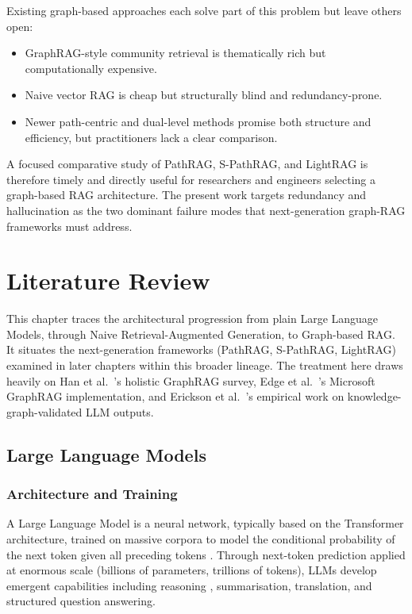 \documentclass[12pt,a4paper,oneside]{report}
\begin{document}
Existing graph-based approaches each solve part of this problem but leave
others open:
\begin{itemize}[leftmargin=2em,itemsep=2pt]
    \item GraphRAG-style community retrieval is thematically rich but
          computationally expensive.
    \item Naive vector RAG is cheap but structurally blind and
          redundancy-prone.
    \item Newer path-centric and dual-level methods promise both structure
          and efficiency, but practitioners lack a clear comparison.
\end{itemize}

A focused comparative study of PathRAG, S-PathRAG, and LightRAG is therefore
timely and directly useful for researchers and engineers selecting a
graph-based RAG architecture. The present work targets redundancy and
hallucination \citep{tonmoy2024} as the two dominant failure modes that
next-generation graph-RAG frameworks must address.

\chapter{Literature Review}
\label{ch:literature_review}

This chapter traces the architectural progression from plain Large Language
Models, through Naive Retrieval-Augmented Generation, to Graph-based RAG. It
situates the next-generation frameworks (PathRAG, S-PathRAG, LightRAG)
examined in later chapters within this broader lineage. The treatment here
draws heavily on Han et al.~\citep{han2025}'s holistic GraphRAG survey,
Edge et al.~\citep{edge2024}'s Microsoft GraphRAG implementation, and Erickson et al.~\citep{erickson2025}'s
empirical work on knowledge-graph-validated LLM outputs.

\section{Large Language Models}
\label{sec:lit_llm}

\subsection{Architecture and Training}

A Large Language Model is a neural network, typically based on the
Transformer architecture, trained on massive corpora to model the
conditional probability of the next token given all preceding tokens
\citep{yang2024}. Through next-token prediction applied at enormous scale
(billions of parameters, trillions of tokens), LLMs develop emergent
capabilities including reasoning \citep{wei2022}, summarisation,
translation, and structured question answering.
\end{document}
